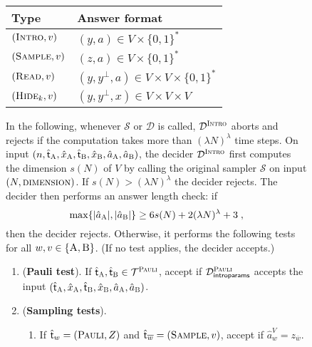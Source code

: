 \documentclass[11pt]{article}
\theoremstyle{definition}
\newcommand{\sampler}{\mathcal{S}}
\newcommand{\decider}{\mathcal{D}}
\newcommand{\type}{\mathcal{T}}
\newcommand{\gamestyle}[1]{\ensuremath{\textsc{#1}}\xspace}
\newcommand{\pauli}{\gamestyle{Pauli}}
\newcommand{\intro}{\gamestyle{Intro}}
\newcommand{\labelstyle}[1]{\ensuremath{\textsc{#1}}\xspace}
\newcommand{\tvarstyle}[1]{\mathsf{#1}}
\newcommand{\tvar}{\ensuremath{\tvarstyle{t}}}
\newcommand{\trole}{\ensuremath{v}} %
\newcommand{\alice}{\labelstyle{A}}
\newcommand{\bob}{\labelstyle{B}}
\newcommand{\typestyle}[1]{\ensuremath{\textsc{#1}}\xspace}
\newcommand{\Pauli}{\typestyle{Pauli}}
\newcommand{\Sample}{\typestyle{Sample}}
\newcommand{\Read}{\typestyle{Read}}
\newcommand{\Hide}[1]{\typestyle{Hide}_{#1}}
\newcommand{\Introspect}{\typestyle{Intro}}
\newcommand{\AB}{\{\alice, \bob\}}
\newcommand{\introparams}{\mathsf{introparams}}
\newenvironment{gamespec}{
  \begin{mdframed}[style=figstyle]}{
  \end{mdframed}}
\begin{document}
\begin{figure}[!htbp]
  \small
  \begin{gamespec}
    \begin{table}[H]
      \centering
      \small
      \begin{tabularx}{.7\textwidth}{l X}
        \toprule
        Type \hspace{6em} & Answer format\\
        \midrule
        $(\Introspect, \trole)$ & $(y,a) \in V \times \{0,1\}^*$ \\
        $(\Sample, \trole)$ &  $(z,a) \in V \times \{0,1\}^*$ \\
        $(\Read, \trole)$ & $(y,y^{\perp},a) \in V \times V \times \{0,1\}^*$\\
        $(\Hide{k}, \trole)$ & $(y,y^{\perp},x) \in V \times V \times V$\\
        \bottomrule
      \end{tabularx}
    \end{table}
    In the following, whenever $\sampler$ or $\decider$ is called,
    $\decider^\intro$ aborts and rejects if the computation takes more than
    $(\lambda N)^\lambda$ time steps.
    On input $(n, \hat{\tvar}_\alice, \hat{x}_\alice, \hat{\tvar}_\bob,
    \hat{x}_\bob, \hat{a}_\alice, \hat{a}_\bob)$, the decider $\decider^\intro$
    first computes the dimension $s(N)$ of $V$ by calling the original sampler
    $\sampler$ on input $(N,\gamestyle{dimension})$.
    If $s(N) > (\lambda N)^\lambda$ the decider rejects.
    The decider then performs an answer length check: if
    \begin{equation}\label{eq:a-length-bound}
      \max \{ |\hat{a}_\alice|, |\hat{a}_\bob| \} \geq
      6s(N) + 2(\lambda N)^\lambda+3\;,
    \end{equation}
    then the decider rejects.
    Otherwise, it performs the following tests for all $w,\trole \in \AB$.
    (If no test applies, the decider accepts.) 
    
    \begin{enumerate}[itemsep=2pt, parsep=2pt]
    \item (\textbf{Pauli test}).
      \label{enu:pauli}
      If $\hat{\tvar}_\alice, \hat{\tvar}_\bob \in \type^\pauli$, accept if
      $\decider^\pauli_\introparams$ accepts the input $(\hat{\tvar}_\alice,
      \hat{x}_\alice, \hat{\tvar}_\bob, \hat{x}_\bob, \hat{a}_\alice,
      \hat{a}_\bob)$.
    \item (\textbf{Sampling tests}).
      \label{enu:sampling}
      \begin{enumerate}
      \item If $\hat{\tvar}_w = (\Pauli,Z)$ and $\hat{\tvar}_{\overline{w}} =
        (\Sample, \trole)$, accept if $\hat{a}_w^V = z_{\overline{w}}$.
        \label{enu:sampling-pauli}


\end{enumerate}
\end{enumerate}
\end{gamespec}
\end{figure}
\end{document}
